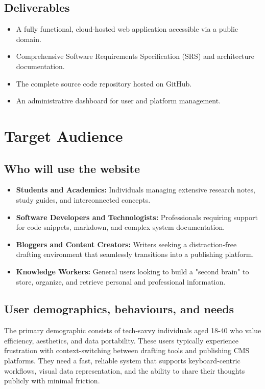 \documentclass[12pt, a4paper]{article}
\begin{document}
\subsection{Deliverables}
\begin{itemize}[leftmargin=2em]
    \item A fully functional, cloud-hosted web application accessible via a public domain.
    \item Comprehensive Software Requirements Specification (SRS) and architecture documentation.
    \item The complete source code repository hosted on GitHub.
    \item An administrative dashboard for user and platform management.
\end{itemize}

\section{Target Audience}

\subsection{Who will use the website}
\begin{itemize}[leftmargin=2em]
    \item \textbf{Students and Academics:} Individuals managing extensive research notes, study guides, and interconnected concepts.
    \item \textbf{Software Developers and Technologists:} Professionals requiring support for code snippets, markdown, and complex system documentation.
    \item \textbf{Bloggers and Content Creators:} Writers seeking a distraction-free drafting environment that seamlessly transitions into a publishing platform.
    \item \textbf{Knowledge Workers:} General users looking to build a "second brain" to store, organize, and retrieve personal and professional information.
\end{itemize}

\subsection{User demographics, behaviours, and needs}
The primary demographic consists of tech-savvy individuals aged 18-40 who value efficiency, aesthetics, and data portability. These users typically experience frustration with context-switching between drafting tools and publishing CMS platforms. They need a fast, reliable system that supports keyboard-centric workflows, visual data representation, and the ability to share their thoughts publicly with minimal friction.
\end{document}

